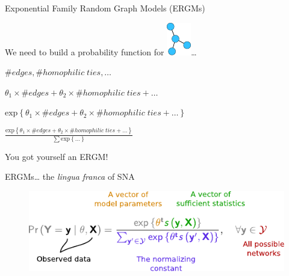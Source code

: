 \documentclass[10pt,ignorenonframetext,aspectratio=169,]{beamer}
\renewcommand{\exp}[1]{\mbox{exp}\left\{#1\right\}}
\begin{document}
\begin{frame}{Exponential Family Random Graph Models (ERGMs)}
\protect\hypertarget{exponential-family-random-graph-models-ergms}{}

We need to build a probability function for
\includegraphics[width=.05\linewidth]{fig/g1.pdf}\ldots{}\pause

\begin{centering}

\def\tbw{.6\linewidth}

  
  \begin{tcolorbox}[width=\tbw]
  $\# edges, \#homophilic\;ties, \dots$
  \end{tcolorbox}\pause
  \begin{tcolorbox}[width=\tbw]
  $\theta_{1} \times \#edges + \theta_{2} \times \#homophilic\;ties + \dots$
  \end{tcolorbox}\pause
  \begin{tcolorbox}[width=\tbw]
  $\exp{\theta_{1} \times \#edges + \theta_{2} \times \#homophilic\;ties + \dots}$
  \end{tcolorbox}\pause
  \begin{tcolorbox}[width=\tbw]
  $\frac{\exp{\theta_{1} \times \#edges + \theta_{2} \times \#homophilic\;ties + \dots}}{\sum \exp{\dots}}$
  \end{tcolorbox}
  
\end{centering}

You got yourself an ERGM!

\end{frame}

\begin{frame}{ERGMs\ldots{} the \textit{lingua franca} of SNA}
\protect\hypertarget{ergms-the-of-sna}{}

\begin{figure}
\centering
  \includegraphics[width = .8\linewidth]{fig/parts-of-ergm.pdf}
\end{figure}

\end{frame}
\end{document}
